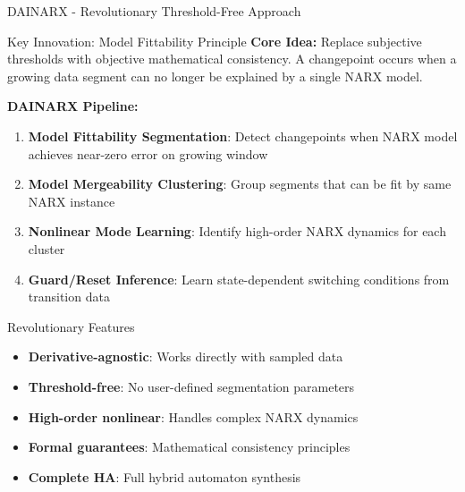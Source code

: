 \documentclass[aspectratio=169]{beamer}
\begin{document}
\begin{frame}{DAINARX - Revolutionary Threshold-Free Approach}
\begin{block}{Key Innovation: Model Fittability Principle}
\textbf{Core Idea:} Replace subjective thresholds with objective mathematical consistency. A changepoint occurs when a growing data segment can no longer be explained by a single NARX model.
\end{block}

\textbf{DAINARX Pipeline:}
\begin{enumerate}
\item \textbf{Model Fittability Segmentation}: Detect changepoints when NARX model achieves near-zero error on growing window
\item \textbf{Model Mergeability Clustering}: Group segments that can be fit by same NARX instance
\item \textbf{Nonlinear Mode Learning}: Identify high-order NARX dynamics for each cluster
\item \textbf{Guard/Reset Inference}: Learn state-dependent switching conditions from transition data
\end{enumerate}

\begin{exampleblock}{Revolutionary Features}
\begin{itemize}
\item \textbf{Derivative-agnostic}: Works directly with sampled data
\item \textbf{Threshold-free}: No user-defined segmentation parameters
\item \textbf{High-order nonlinear}: Handles complex NARX dynamics
\item \textbf{Formal guarantees}: Mathematical consistency principles
\item \textbf{Complete HA}: Full hybrid automaton synthesis
\end{itemize}
\end{exampleblock}
\end{frame}
\end{document}
